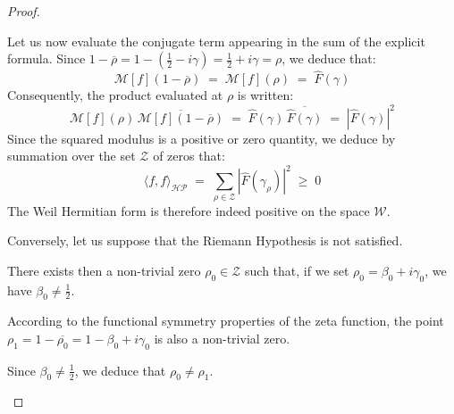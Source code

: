 \documentclass[Riemann_Hypothesis.tex]{subfiles}
\begin{document}
\begin{proof}
\begin{part_proof}
        Let us now evaluate the conjugate term appearing in the sum of the explicit formula. Since $1 - \overline{\rho} = 1 - \left( \frac{1}{2} - i\gamma \right) = \frac{1}{2} + i\gamma = \rho$, we deduce that:
        \begin{equation*}
            \mathcal{M}[f](1 - \overline{\rho}) \;=\; \mathcal{M}[f](\rho) \;=\; \hat{F}(\gamma)
        \end{equation*}
        Consequently, the product evaluated at $\rho$ is written:
        \begin{equation*}
            \mathcal{M}[f](\rho) \, \overline{\mathcal{M}[f](1 - \overline{\rho})} \;=\; \hat{F}(\gamma) \, \overline{\hat{F}(\gamma)} \;=\; \left| \hat{F}(\gamma) \right|^2
        \end{equation*}
        Since the squared modulus is a positive or zero quantity, we deduce by summation over the set $\mathcal{Z}$ of zeros that:
        \begin{equation*}
            \langle f, f \rangle_{\mathcal{HP}} \;=\; \sum_{\rho \in \mathcal{Z}} \left| \hat{F}(\gamma_\rho) \right|^2 \;\geq\; 0
        \end{equation*}
        The Weil Hermitian form is therefore indeed positive on the space $\mathcal{W}$.
    \end{part_proof}

    \begin{part_proof}
        Conversely, let us suppose that the Riemann Hypothesis is not satisfied. \par
        There exists then a non-trivial zero $\rho_0 \in \mathcal{Z}$ such that, if we set $\rho_0 = \beta_0 + i\gamma_0$, we have $\beta_0 \neq \frac{1}{2}$. \par
        According to the functional symmetry properties of the zeta function, the point $\rho_1 = 1 - \overline{\rho_0} = 1 - \beta_0 + i\gamma_0$ is also a non-trivial zero. \par
        Since $\beta_0 \neq \frac{1}{2}$, we deduce that $\rho_0 \neq \rho_1$. \medskip\par


\end{part_proof}
\end{proof}
\end{document}
